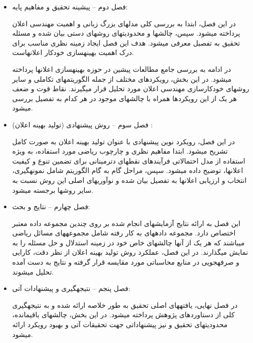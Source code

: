 \begin{itemize}
	\item فصل دوم – پیشینه تحقیق و مفاهیم پایه:
	
	در این فصل، ابتدا به بررسی کلی مدل\/های بزرگ زبانی و اهمیت مهندسی اعلان پرداخته می\/شود. سپس، چالش\/ها و محدودیت\/های روش\/های دستی بیان شده و مسئله تحقیق به تفصیل معرفی می\/شود. هدف این فصل ایجاد زمینه نظری مناسب برای درک اهمیت بهینه\/سازی خودکار اعلان\/هاست.
	
	در ادامه به بررسی جامع مطالعات پیشین در حوزه بهینه\/سازی اعلان\/ها پرداخته می\/شود. در این بخش، رویکردهای مختلف از جمله الگوریتم\/های تکاملی و سایر روش\/های خودکارسازی مهندسی اعلان مورد تحلیل قرار می\/گیرند. نقاط قوت و ضعف هر یک از این رویکردها همراه با چالش\/های موجود در هر کدام به تفصیل بررسی می\/شود.
	
	\item فصل سوم – روش پیشنهادی (تولید بهینه اعلان) :
	
	در این فصل، رویکرد نوین پیشنهادی با عنوان تولید بهینه اعلان به صورت کامل تشریح می\/شود. ابتدا مفاهیم نظری و چارچوب ریاضی مورد استفاده، به ویژه استفاده از مدل احتمالاتی فرآیندهای نقطه\/ای دترمینانی برای تضمین تنوع و کیفیت اعلان\/ها، توضیح داده می\/شود. سپس، مراحل گام به گام الگوریتم شامل نمونه\/گیری، انتخاب و ارزیابی اعلان\/ها به تفصیل بیان شده و نوآوری\/های اصلی این روش نسبت به سایر روش\/ها برجسته می\/شود.
	
	\item فصل چهارم – نتایج و بحث:
	
	این فصل به ارائه نتایج آزمایش\/های انجام شده بر روی چندین مجموعه داده معتبر اختصاص دارد. مجموعه داده\/های به کار رفته شامل مجموعه\/های مسائل ریاضی می\/باشند که هر یک از آن\/ها چالش\/های خاص خود در زمینه استدلال و حل مسئله را به نمایش می\/گذارند. در این فصل، عملکرد روش تولید بهینه اعلان از نظر دقت، کارایی و صرفه\/جویی در منابع محاسباتی مورد مقایسه قرار گرفته و نتایج به دست آمده تحلیل می\/شوند.
	
	\item فصل پنجم – نتیجه\/گیری و پیشنهادات آتی:
	
	در فصل نهایی، یافته\/های اصلی تحقیق به طور خلاصه ارائه شده و به نتیجه\/گیری کلی از دستاوردهای پژوهش پرداخته می\/شود. در این بخش، چالش\/های باقی\/مانده، محدودیت\/های تحقیق و نیز پیشنهاداتی جهت تحقیقات آتی و بهبود رویکرد ارائه می\/شود.
\end{itemize}




